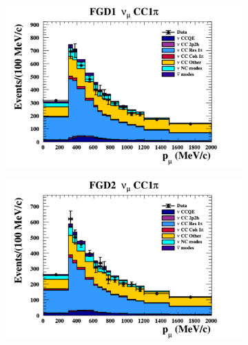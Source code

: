 \begin{figure}[h]
\begin{subfigure}[t]{0.49\textwidth}
  \end{subfigure}
  \begin{subfigure}[t]{0.49\textwidth}
    \includegraphics[width=\textwidth, trim={0mm 0mm 0mm 0mm}, clip,page=1]{Figures/Selections/Pmu_1D_modes_FGD1_numuCC_1pi_Data_prefit.pdf}
  \end{subfigure}%
  \begin{subfigure}[t]{0.49\textwidth}
    \includegraphics[width=\textwidth, trim={0mm 0mm 0mm 0mm}, clip,page=1]{Figures/Selections/Pmu_1D_modes_FGD2_numuCC_1pi_Data_prefit.pdf}
  \end{subfigure}
  \begin{subfigure}[t]{0.49\textwidth}

\end{subfigure}
\end{figure}
